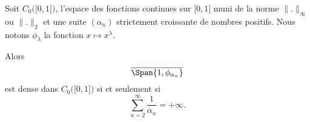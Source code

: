\begin{theorem}  \label{ThoAEYDdHp}
    Soit \( C_0\big( \mathopen[ 0 , 1 \mathclose] \big)\), l'espace des fonctions continues sur \( \mathopen[ 0 , 1 \mathclose]\) muni de la norme \( \| . \|_{\infty}\) ou \( \| . \|_2\) et une suite \( (\alpha_n)\) strictement croissante de nombres positifs. Nous notons \( \phi_{\lambda}\) la fonction \( x\mapsto x^{\lambda}\).

    Alors
    \begin{equation}
        \overline{  \Span\{1, \phi_{\alpha_n} \} }
    \end{equation}
    est dense dans \( C_0\big( \mathopen[ 0 , 1 \mathclose] \big)\)  si et seulement si
    \begin{equation}
        \sum_{n=2}^{\infty}\frac{1}{ \alpha_n }=+\infty.
    \end{equation}
\end{theorem}

